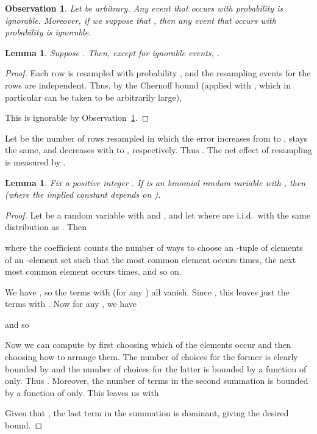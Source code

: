 \documentclass[letterpaper,11pt]{article}
\newtheorem{lemma}[theorem]{Lemma}
\newtheorem{observation}[theorem]{Observation}
\begin{document}
\begin{observation} \label{obs:whatisignorable}
Let  be arbitrary.  Any event that occurs with probability
 is ignorable.  Moreover, if we suppose that
, then any event that occurs with probability 
is ignorable.
\end{observation}

\begin{lemma} \label{lma:fimtimsmallk1}
Suppose .  Then, except for ignorable events, .
\end{lemma}
\begin{proof}
Each row is resampled with probability , and the resampling events for the  rows
are independent.  Thus, by the Chernoff bound 
(applied with , which in particular can be taken to be arbitrarily large),

This is ignorable by Observation~\ref{obs:whatisignorable}.
\end{proof}

Let  be the number of rows resampled
in which the error increases from  to , stays the same, and decreases with  to ,
respectively.  Thus .
The net effect of resampling is measured by .

\begin{lemma} \label{lma:binomial}
Fix a positive integer .  If
 is an  binomial random variable with , then
 (where the implied constant depends on ).
\end{lemma}
\begin{proof}
Let  be a random variable with
 and , and let
 where
 are i.i.d.\ with the same distribution as .  Then

where the coefficient  counts the number of ways to choose
an -tuple of elements of an -element set such that the most common element
occurs  times, the next most common element occurs  times, and so on.

We have , so the terms with  (for any ) all vanish.  Since ,
this leaves just the terms with .  Now for any , we have

and so


Now we can compute  by first choosing which  of the  elements occur
and then choosing how to arrange them.  The number of choices for the former is clearly
bounded by  and the number of choices for the latter is bounded by a function of  only.
Thus .  Moreover, the number of terms in the
second summation is bounded by a function of  only.  This leaves us with

Given that , the last term in the summation is dominant, giving
the desired bound.
\end{proof}
\end{document}
